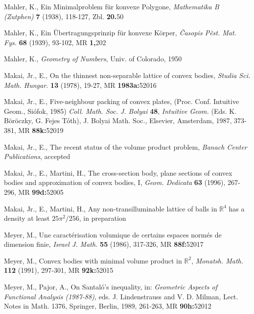 \documentclass[12pt]{article}
\begin{document}
\begin{thebibliography}{999999}
Mahler, K.,
Ein Minimalproblem f\"ur konvexe Polygone,
{\it{Mathematika B (Zutphen)}} {\bf{7}} 
(1938), 118-127, Zbl. {\bf{20.}}{\rm{50}}

Mahler, K.,
Ein \"Ubertragungsprinzip f\"ur konvexe K\"orper,
{\it{\v Casopis P\v est. Mat. Fys.}} {\bf{68}} 
(1939), 93-102, MR {\bf{1,}}{\rm{202}} 

Mahler, K.,
{\it{Geometry of Numbers}}, Univ. of Colorado, 1950

Makai, Jr., E.,
On the thinnest non-separable lattice of convex bodies,
{\it{Studia Sci. Math. Hungar.}} {\bf{13}} 
(1978), 19-27, MR {\bf{1983a:}}{\rm{52016}}

Makai, Jr., E.,
Five-neighbour packing of convex plates,
(Proc. Conf. Intuitive Geom., Si\'ofok, 1985) {\it{Coll. Math. Soc. J. Bolyai}}
{\bf{48}}, {\it{Intuitive Geom.}}
(Eds. K. B\"or\"oczky, G. Fejes T\'oth), J. Bolyai Math. Soc., Elsevier,
Amsterdam, 1987, 373-381, MR {\bf{88k:}}{\rm{52019}}

Makai, Jr., E.,
The recent status of the volume product problem,
{\it{Banach Center Publications}}, accepted

Makai, Jr., E., Martini, H.,
The cross-section body, plane sections of convex bodies and
approximation of convex bodies, I,
{\it{Geom. Dedicata}} {\bf{63}} (1996), 267-296, MR {\bf{99d:}}{\rm{52005}}

Makai, Jr., E., Martini, H.,
Any non-transilluminable lattice of balls in ${\mathbb R}^4$ has a density
at least $25 \pi ^2 / 256$, in preparation

Meyer, M.,
Une caract\'erisation 
volumique de certains espaces norm\'es de dimension finie,
{\it{Israel J. Math.}} {\bf{55}} (1986), 317-326, MR {\bf{88f:}}{\rm{52017}}

Meyer, M.,
Convex bodies with minimal volume product in ${\mathbb R}^2$,
{\it{Monatsh. Math.}} {\bf{112}} (1991), 297-301, MR {\bf{92k:}}{\rm{52015}}

Meyer, M., Pajor, A.,
On Santal\'o's inequality, in: 
{\it{Geometric Aspects of Functional Analysis (1987-88),}} 
eds. J. Lindenstrauss and
V. D. Milman, Lect. Notes in Math. 1376, Springer, Berlin, 1989, 261-263, 
MR {\bf{90h:}}{\rm{52012}}


\end{thebibliography}
\end{document}
